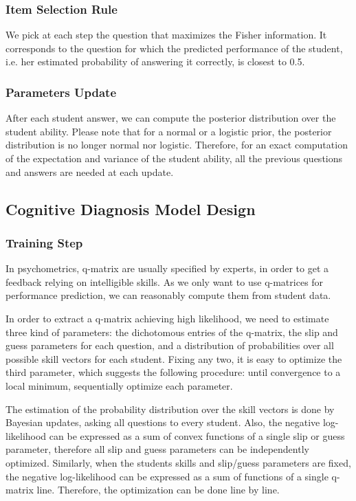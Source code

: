 \documentclass{edm_template}
\begin{document}
\subsubsection{Item Selection Rule}

We pick at each step the question that maximizes the Fisher information. It corresponds to the question for which the predicted performance of the student, i.e. her estimated probability of answering it correctly, is closest to 0.5. %

\subsubsection{Parameters Update}

After each student answer, we can compute the posterior distribution over the student ability. Please note that for a normal or a logistic prior, the posterior distribution is no longer normal nor logistic. Therefore, for an exact computation of the expectation and variance of the student ability, all the previous questions and answers are needed at each update.

\subsection{Cognitive Diagnosis Model Design}

\subsubsection{Training Step}

In psychometrics, q-matrix are usually specified by experts, in order to get a feedback relying on intelligible skills. As we only want to use q-matrices for performance prediction, we can reasonably compute them from student data.

In order to extract a q-matrix achieving high likelihood, we need to estimate three kind of parameters: the dichotomous entries of the q-matrix, the slip and guess parameters for each question, and a distribution of probabilities over all possible skill vectors for each student. Fixing any two, it is easy to optimize the third parameter, which suggests the following procedure: until convergence to a local minimum, sequentially optimize each parameter.

The estimation of the probability distribution over the skill vectors is done by Bayesian updates, asking all questions to every student. Also, the negative log-likelihood can be expressed as a sum of convex functions of a single slip or guess parameter, therefore all slip and guess parameters can be independently optimized.  Similarly, when the students skills and slip/guess parameters are fixed, the negative log-likelihood can be expressed as a sum of functions of a single q-matrix line. Therefore, the optimization can be done line by line. %
\end{document}

